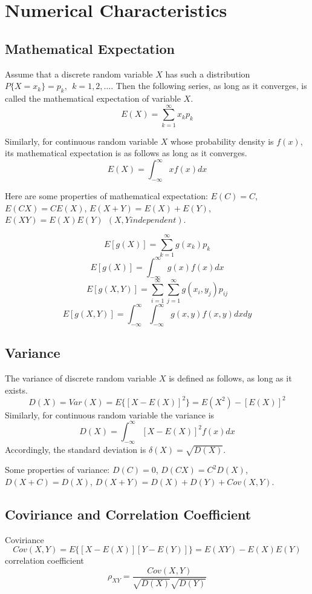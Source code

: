 
\section{Numerical Characteristics}

\subsection{Mathematical Expectation}

Assume that a discrete random variable $X$ has such a distribution
$P\{X=x_k\}=p_k,~~k=1,2,\ldots$. Then the following series, as long
as it converges, is called the mathematical expectation of variable $X$.
$$ E(X) = \sum\limits_{k=1}^\infty x_k p_k $$

Similarly, for continuous random variable $X$ whose probability density
is $f(x)$, its mathematical expectation is as follows as long as it
converges.
$$ E(X) = \int^\infty_{-\infty} xf(x)dx $$

Here are some properties of mathematical expectation: $E(C)=C$,
$E(CX)=CE(X)$, $E(X+Y)=E(X)+E(Y)$, $E(XY)=E(X)E(Y) ~~ (X,Y independent)$.

$$E[g(X)] = \sum_{k=1}^\infty g(x_k)p_k$$
$$E[g(X)] = \int_{-\infty}^\infty g(x)f(x)dx$$
$$E[g(X,Y)] = \sum_{i=1}^\infty \sum_{j=1}^\infty g(x_i,y_j)p_{ij}$$
$$E[g(X,Y)] = \int_{-\infty}^\infty\int_{-\infty}^\infty g(x,y)f(x,y)dxdy$$

\subsection{Variance}
The variance of discrete random variable $X$ is defined as follows,
as long as it exists.
$$ D(X)=Var(X)=E\{ [X-E(X)]^2 \} = E(X^2)-[E(X)]^2 $$
Similarly, for continuous random variable the variance is
$$ D(X) = \int^\infty_{-\infty} [X-E(X)]^2 f(x)dx $$
Accordingly, the standard deviation is $\delta(X)=\sqrt{D(X)}$.

Some properties of variance: $D(C)=0$, $D(CX)=C^2 D(X)$,
$D(X+C)=D(X)$, $D(X+Y)=D(X)+D(Y)+Cov(X,Y)$.

\subsection{Coviriance and Correlation Coefficient}
 Coviriance
 $$ Cov(X,Y) = E\{ [X-E(X)][Y-E(Y)] \} = E(XY) - E(X)E(Y)$$
 correlation coefficient
 $$ \rho_{XY} = \frac{Cov(X,Y)}{ \sqrt{D(X)} \sqrt{D(Y)} } $$

